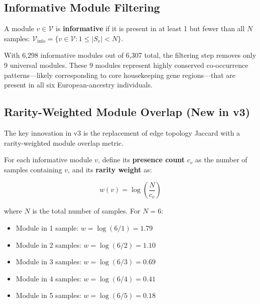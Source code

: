\documentclass{../yalumba}
\begin{document}
\subsection{Informative Module Filtering}

\begin{definition}
A module $v \in \mathcal{V}$ is \textbf{informative} if it is present in
at least 1 but fewer than all $N$ samples:
$\mathcal{V}_{\text{info}} = \{v \in \mathcal{V} : 1 \leq |S_v| < N\}$.
\end{definition}

With 6{,}298 informative modules out of 6{,}307 total, the filtering step
removes only 9 universal modules.  These 9 modules represent highly conserved
co-occurrence patterns---likely corresponding to core housekeeping gene
regions---that are present in all six European-ancestry individuals.

\subsection{Rarity-Weighted Module Overlap (New in v3)}
\label{sec:rarity}

The key innovation in v3 is the replacement of edge topology Jaccard with
a rarity-weighted module overlap metric.

For each informative module $v$, define its \textbf{presence count} $c_v$ as
the number of samples containing $v$, and its \textbf{rarity weight} as:

\begin{equation}
  w(v) = \log\!\left(\frac{N}{c_v}\right)
  \label{eq:rarity-weight}
\end{equation}

\noindent where $N$ is the total number of samples.  For $N = 6$:

\begin{itemize}
  \item Module in 1 sample: $w = \log(6/1) = 1.79$
  \item Module in 2 samples: $w = \log(6/2) = 1.10$
  \item Module in 3 samples: $w = \log(6/3) = 0.69$
  \item Module in 4 samples: $w = \log(6/4) = 0.41$
  \item Module in 5 samples: $w = \log(6/5) = 0.18$
\end{itemize}

\end{document}
